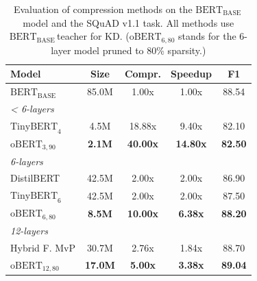 \documentclass[11pt]{article}
\newcommand{\bert}{$\textrm{BERT}_{\textrm{BASE}}\,$}
\begin{document}
\begin{table}[h!]
\setlength{\tabcolsep}{5pt}
    \centering
    {\small 
    \begin{tabular}{lcccc}
    \toprule 
    Model & Size & Compr. & Speedup & F1 \\
    \midrule
    \bert & 85.0M & \phantom{1}1.00x & \phantom{1}1.00x & 88.54 \\
    \midrule
    \multicolumn{5}{l}{\textit{< 6-layers}} \\
    $\textrm{TinyBERT}_4$ & \phantom{8}4.5M & 18.88x & \phantom{1}9.40x & 82.10 \\
    $\textrm{oBERT}_{3,90}$ & \phantom{8}\textbf{2.1M} & \textbf{40.00x} & \textbf{14.80x} & \textbf{82.50} \\
    \midrule
    \multicolumn{5}{l}{\textit{6-layers}} \\
    DistilBERT & 42.5M & \phantom{1}2.00x & 2.00x & 86.90 \\
    $\textrm{TinyBERT}_6$ & 42.5M & \phantom{1}2.00x & 2.00x & 87.50 \\
    $\textrm{oBERT}_{6,80}$ & \phantom{1}\textbf{8.5M} & \textbf{10.00x} & \textbf{6.38x} & \textbf{88.20} \\ 
    \midrule
    \multicolumn{5}{l}{\textit{12-layers}} \\
    Hybrid F. MvP & 30.7M & \phantom{1}2.76x & 1.84x & 88.70 \\
    $\textrm{oBERT}_{12,80}$ & \textbf{17.0M} & \phantom{1}\textbf{5.00x} & \textbf{3.38x} & \textbf{89.04} \\
    \bottomrule
    \end{tabular}
    }
    \caption{Evaluation of compression methods on the \bert model and the SQuAD v1.1 task. All methods use \bert teacher for KD. ($\textrm{oBERT}_{6,80}$ stands for the 6-layer model pruned to 80\% sparsity.)}
    \label{tab:other-methods}
    \vspace{-1em}
\end{table}

\end{document}
